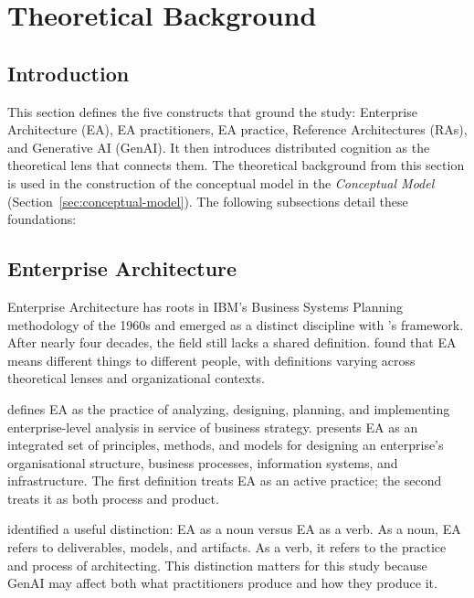 \section{Theoretical Background}\label{sec:theoretical-background}

\subsection*{Introduction}

This section defines the five constructs that ground the study: Enterprise
Architecture (EA), EA practitioners, EA practice, Reference Architectures (RAs),
and Generative AI (GenAI). It then introduces distributed cognition as the
theoretical lens that connects them. The theoretical background from this
section is used in the construction of the conceptual model in
the \textit{Conceptual Model} (Section~\ref{sec:conceptual-model}). The following subsections detail these
foundations:

\localtableofcontents\clearpage

\subsection{Enterprise Architecture}\label{subsec:enterprise-architecture}

Enterprise Architecture has roots in IBM's Business Systems Planning methodology
of the 1960s \parencite{kotusev_enterprise_2018} and emerged as a distinct
discipline with \textcite{zachman_zachman_1987}'s framework. After nearly four
decades, the field still lacks a shared definition.
\textcite{saint-louis_investigation_2019} found that EA means different things
to different people, with definitions varying across theoretical lenses and
organizational contexts.

\textcite{the_open_group_togaf_2022} defines EA as the practice of analyzing,
designing, planning, and implementing enterprise-level analysis in service of
business strategy. \textcite{lankhorst_enterprise_2017} presents EA as an
integrated set of principles, methods, and models for designing an enterprise's
organisational structure, business processes, information systems, and
infrastructure. The first definition treats EA as an active practice; the second
treats it as both process and product.

\textcite{saint-louis_investigation_2019} identified a useful distinction: EA
as a noun versus EA as a verb. As a noun, EA refers to deliverables, models, and
artifacts. As a verb, it refers to the practice and process of architecting.
This distinction matters for this study because GenAI may affect both what
practitioners produce and how they produce it.


